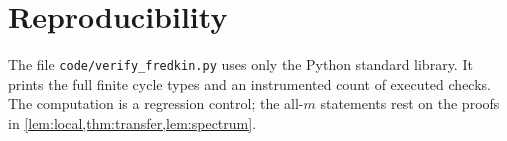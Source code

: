 \documentclass[11pt,a4paper]{amsart}
\theoremstyle{definition}
\theoremstyle{remark}
\begin{document}
\section*{Reproducibility}

The file \texttt{code/verify\_fredkin.py} uses only the Python standard
library.  It prints the full finite cycle types and an instrumented count of
executed checks.  The computation is a regression control; the all-$m$
statements rest on the proofs in \cref{lem:local,thm:transfer,lem:spectrum}.



\end{document}
